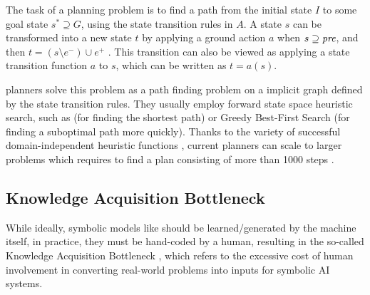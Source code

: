 \documentclass[11pt]{article}
\begin{document}
The task of a planning problem is to find a path from the initial state
$I$ to some goal state $s^*\supseteq G$, using the state transition
rules in $A$. A state $s$ can be transformed into a new state $t$ by
applying a ground action $a$ when $s\supseteq \mbox{\textit{pre}}$, and
then $t=(s\setminus e^-)\cup e^+$ \cite{bacchus2000}. This transition
can also be viewed as applying a state transition function $a$ to $s$,
which can be written as $t=a(s)$.


\sota planners solve this problem as a path finding problem on a
implicit graph defined by the state transition rules. They usually
employ forward state space heuristic search, such as \astar (for finding
the shortest path) or Greedy Best-First Search (for finding a suboptimal
path more quickly). Thanks to the variety of successful
domain-independent heuristic functions
\cite{Helmert2009,sievers2012efficient,helmert2007flexible,bonet2013admissible,hoffmann01,Helmert04,richter2008landmarks},
current \lsota planners can scale to larger problems which requires to
find a plan consisting of more than 1000 steps \cite{Asai2015}.




\subsection{Knowledge Acquisition Bottleneck}

While ideally, symbolic models like  should be learned/generated by the machine itself,
in practice, they must be hand-coded by a human, resulting in the 
% 
so-called Knowledge Acquisition Bottleneck \cite{cullen88}, 
which refers to the excessive cost of human involvement in converting real-world problems into inputs for symbolic AI systems.
\end{document}
